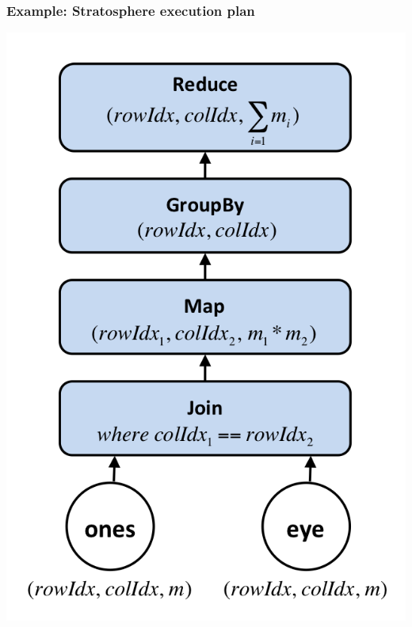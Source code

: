 \begin{frame}
	\frametitle{Example: Stratosphere execution plan}
	\begin{center}
		\includegraphics[height=0.85\textheight]{images/matrixMultDataflow.png}
	\end{center}
\end{frame}